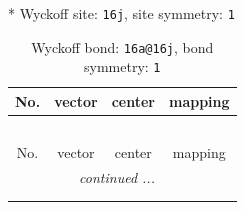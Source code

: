 \documentclass[fleqn,8pt]{jsarticle}
\begin{document}
* Wyckoff site: {\tt 16j}, site symmetry: {\tt 1}
\renewcommand{\arraystretch}{1.2}
\begin{longtable}{cccc}
\caption{Wyckoff bond: {\tt 16a@16j}, bond symmetry: {\tt 1}}
 \\
 \hline \hline
No. & vector & center & mapping \\ \hline \endfirsthead

\multicolumn{3}{l}{\tablename\ \thetable{}} \\
 \hline \hline
No. & vector & center & mapping \\ \hline \endhead

 \hline \hline
\multicolumn{3}{r}{\footnotesize\it continued ...} \\ \endfoot

 \hline \hline
\multicolumn{3}{r}{} \\ \endlastfoot


\end{longtable}
\end{document}
